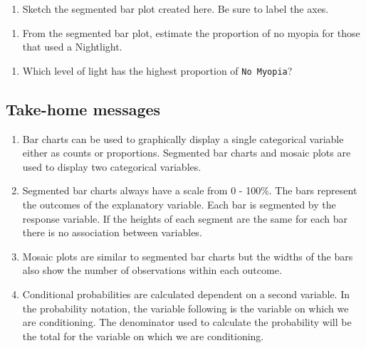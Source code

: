 \documentclass[
]{report}
\providecommand{\tightlist}{%
  \setlength{\itemsep}{0pt}\setlength{\parskip}{0pt}}
\begin{document}
\begin{enumerate}
\def\labelenumi{\arabic{enumi}.}
\setcounter{enumi}{4}
\tightlist
\item
  Sketch the segmented bar plot created here. Be sure to label the axes.
\end{enumerate}

\vspace{1.5in}

\begin{enumerate}
\def\labelenumi{\arabic{enumi}.}
\setcounter{enumi}{5}
\tightlist
\item
  From the segmented bar plot, estimate the proportion of no myopia for those that used a Nightlight.
\end{enumerate}

\vspace{0.5in}

\begin{enumerate}
\def\labelenumi{\arabic{enumi}.}
\setcounter{enumi}{6}
\tightlist
\item
  Which level of light has the highest proportion of \texttt{No\ Myopia}?
\end{enumerate}

\vspace{0.5in}

\hypertarget{take-home-messages-2}{%
\subsection{Take-home messages}\label{take-home-messages-2}}

\begin{enumerate}
\def\labelenumi{\arabic{enumi}.}
\item
  Bar charts can be used to graphically display a single categorical variable either as counts or proportions. Segmented bar charts and mosaic plots are used to display two categorical variables.
\item
  Segmented bar charts always have a scale from 0 - 100\%. The bars represent the outcomes of the explanatory variable. Each bar is segmented by the response variable. If the heights of each segment are the same for each bar there is no association between variables.
\item
  Mosaic plots are similar to segmented bar charts but the widths of the bars also show the number of observations within each outcome.
\item
  Conditional probabilities are calculated dependent on a second variable. In the probability notation, the variable following \texttt{\textbar{}} is the variable on which we are conditioning. The denominator used to calculate the probability will be the total for the variable on which we are conditioning.
\end{enumerate}
\end{document}
